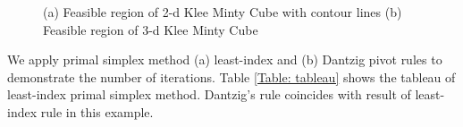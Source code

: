 \documentclass[11pt]{article}
\begin{document}
\begin{figure}
    \centering
    \caption{(a) Feasible region of 2-d Klee Minty Cube with contour lines (b) Feasible region of 3-d Klee Minty Cube}
    \label{fig:kmcube}
\end{figure}
We apply primal simplex method (a) least-index and (b) Dantzig pivot rules to demonstrate the number of iterations. Table \ref{Table: tableau} shows the tableau of least-index primal simplex method. Dantzig's rule coincides with result of least-index rule in this example. 
\end{document}
